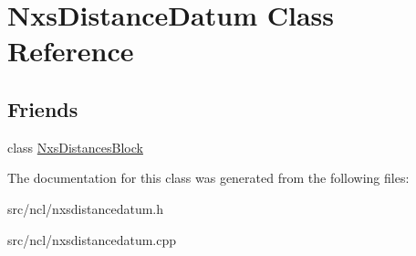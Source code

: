 \hypertarget{classNxsDistanceDatum}{
\section{NxsDistanceDatum Class Reference}
\label{classNxsDistanceDatum}
}
\subsection*{Friends}
\begin{DoxyCompactItemize}
\item 
\hypertarget{classNxsDistanceDatum_aa46e2fbd4a6264cf2f0f91035cdf6188}{
class \hyperlink{classNxsDistanceDatum_aa46e2fbd4a6264cf2f0f91035cdf6188}{NxsDistancesBlock}}
\label{classNxsDistanceDatum_aa46e2fbd4a6264cf2f0f91035cdf6188}

\end{DoxyCompactItemize}


The documentation for this class was generated from the following files:\begin{DoxyCompactItemize}
\item 
src/ncl/nxsdistancedatum.h\item 
src/ncl/nxsdistancedatum.cpp\end{DoxyCompactItemize}

